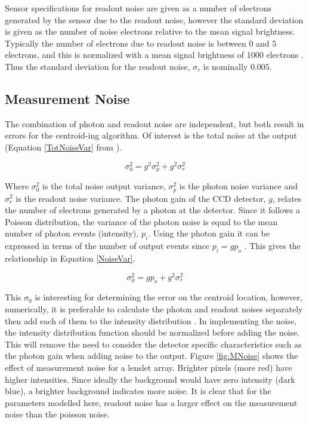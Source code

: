 Sensor specifications for readout noise are given as a number of electrons generated by the sensor due to the readout noise, however the standard deviation is given as the number of noise electrons relative to the mean signal brightness.  Typically the number of electrons due to readout noise is between 0 and 5 electrons, and this is normalized with a mean signal brightness of 1000 electrons \cite{SHWFS2006}.  Thus the standard deviation for the readout noise, $\sigma_r$ is nominally $0.005$.  

\subsection{Measurement Noise}
The combination of photon and readout noise are independent, but both result in errors for the centroid-ing algorithm.  Of interest is the total noise at the output (Equation \ref{TotNoiseVar} from \cite{AccHS1994}).

\begin{equation}
\sigma_0^2 = g^2\sigma_p^2 + g^2\sigma_r^2
\label{TotNoiseVar}
\end{equation}

Where $\sigma_0^2$ is the total noise output variance, $\sigma_p^2$ is the photon noise variance and $\sigma_r^2$ is the readout noise variance.  The photon gain of the CCD detector, $g$, relates the number of electrons generated by a photon at the detector.  Since it follows a Poisson distribution, the variance of the photon noise is equal to the mean number of photon events (intensity), $p_i$.  Using the photon gain it can be expressed in terms of the number of output events since $p_i = gp_o$ \cite{AccHS1994}.  This gives the relationship in Equation \ref{NoiseVar}.

\begin{equation}
\sigma_0^2 = gp_o + g^2\sigma_r^2
\label{NoiseVar}
\end{equation}

This $\sigma_0$ is interesting for determining the error on the centroid location, however, numerically, it is preferable to calculate the photon and readout noises separately then add each of them to the intensity distribution \cite{AccHS1994}.  In implementing the noise, the intensity distribution function should be normalized before adding the noise.  This will remove the need to consider the detector specific characteristics such as the photon gain when adding noise to the output.  Figure \ref{fig:MNoise} shows the effect of measurement noise for a lenslet array.  Brighter pixels (more red) have higher intensities. Since ideally the background would have zero intensity (dark blue), a brighter background indicates more noise.  It is clear that for the parameters modelled here, readout noise has a larger effect on the measurement noise than the poisson noise.  

